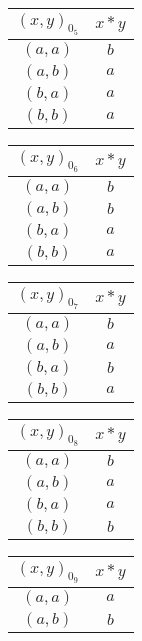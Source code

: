 \documentclass[nohyper,nobib]{tufte-handout}
\theoremstyle{definition}
\theoremstyle{remark}
\begin{document}
\begin{enumerate}
        \begin{table}[h]
            \begin{tabular}{@{}c|c@{}}
                $(x, y)_{0_{5}}$ & $x * y$ \\
                \midrule
                $(a, a)$ & $b$ \\
                $(a, b)$ & $a$ \\
                $(b, a)$ & $a$ \\
                $(b, b)$ & $a$
            \end{tabular}
            \qquad
            \begin{tabular}{@{}c|c@{}}
                $(x, y)_{0_{6}}$ & $x * y$ \\
                \midrule
                $(a, a)$ & $b$ \\
                $(a, b)$ & $b$ \\
                $(b, a)$ & $a$ \\
                $(b, b)$ & $a$
            \end{tabular}
            \qquad
            \begin{tabular}{@{}c|c@{}}
                $(x, y)_{0_{7}}$ & $x * y$ \\
                \midrule
                $(a, a)$ & $b$ \\
                $(a, b)$ & $a$ \\
                $(b, a)$ & $b$ \\
                $(b, b)$ & $a$
            \end{tabular}
            \qquad
            \begin{tabular}{@{}c|c@{}}
                $(x, y)_{0_{8}}$ & $x * y$ \\
                \midrule
                $(a, a)$ & $b$ \\
                $(a, b)$ & $a$ \\
                $(b, a)$ & $a$ \\
                $(b, b)$ & $b$
            \end{tabular}
        \end{table}
        \clearpage
        \begin{table}[ht!]
            \begin{tabular}{@{}c|c@{}}
                $(x, y)_{0_{9}}$ & $x * y$ \\
                \midrule
                $(a, a)$ & $a$ \\
                $(a, b)$ & $b$ \\

\end{tabular}
\end{table}
\end{enumerate}
\end{document}
